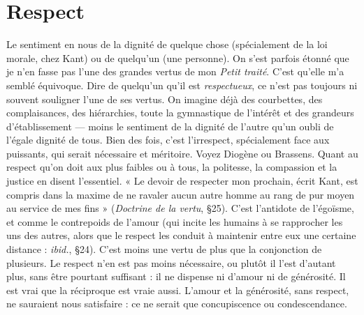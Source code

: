\section{Respect}
Le sentiment en nous de la dignité de quelque chose (spécialement
de la loi morale, chez Kant) ou de quelqu'un (une personne).
On s’est parfois étonné que je n’en fasse pas l’une des grandes vertus de
mon {\it Petit traité}. C’est qu’elle m’a semblé équivoque. Dire de quelqu'un qu’il
est {\it respectueux}, ce n’est pas toujours ni souvent souligner l’une de ses vertus.
On imagine déjà des courbettes, des complaisances, des hiérarchies, toute la
gymnastique de l’intérêt et des grandeurs d’établissement — moins le sentiment
de la dignité de l’autre qu’un oubli de l’égale dignité de tous. Bien des fois, c’est
l’irrespect, spécialement face aux puissants, qui serait nécessaire et méritoire.
Voyez Diogène ou Brassens. Quant au respect qu’on doit aux plus faibles ou à
tous, la politesse, la compassion et la justice en disent l’essentiel. « Le devoir de
respecter mon prochain, écrit Kant, est compris dans la maxime de ne ravaler
aucun autre homme au rang de pur moyen au service de mes fins » ({\it Doctrine de
la vertu}, \S 25). C’est l'antidote de l’égoïsme, et comme le contrepoids de
l'amour (qui incite les humains à se rapprocher les uns des autres, alors que le
respect les conduit à maintenir entre eux une certaine distance : {\it ibid.}, \S 24).
C’est moins une vertu de plus que la conjonction de plusieurs. Le respect n’en
est pas moins nécessaire, ou plutôt il l’est d’autant plus, sans être pourtant
suffisant : il ne dispense ni d’amour ni de générosité. Il est vrai que la réciproque
est vraie aussi. L'amour et la générosité, sans respect, ne sauraient nous
satisfaire : ce ne serait que concupiscence ou condescendance.

